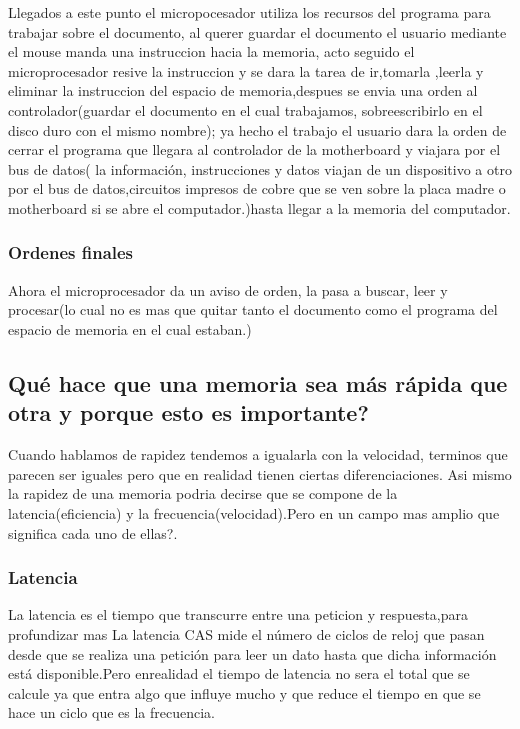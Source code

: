 \documentclass{article}
\begin{document}
        Llegados a este punto el micropocesador utiliza los recursos del programa para trabajar sobre el documento, al querer guardar el documento el usuario mediante el mouse manda una instruccion hacia la memoria, acto seguido el microprocesador resive la instruccion y se dara la tarea de ir,tomarla ,leerla y eliminar la instruccion del espacio de memoria,despues se envia  una orden al controlador(guardar el documento en el cual trabajamos, sobreescribirlo en el disco duro con el mismo nombre); ya hecho el trabajo el usuario dara la orden de cerrar el programa que llegara al controlador de la motherboard y viajara por el bus de datos( la información, instrucciones y datos viajan de un dispositivo a otro por el bus de datos,circuitos impresos de cobre que se ven sobre la placa madre o
        motherboard si se abre el computador.)hasta llegar  a la memoria del computador.\cite{profe}
        
        \subsubsection{Ordenes finales} Ahora el microprocesador da  un aviso de orden, la pasa a buscar, leer y procesar(lo cual no es mas que quitar tanto el documento como el programa del espacio de memoria en el cual estaban.)
        

    \subsection{Qué hace que una memoria sea más rápida que otra y porque esto es importante?}
    
    Cuando hablamos de rapidez tendemos a igualarla con la velocidad, terminos que parecen ser iguales pero que en realidad tienen ciertas diferenciaciones. Asi mismo la rapidez de  una memoria podria decirse que se compone de la latencia(eficiencia) y la frecuencia(velocidad).Pero en un campo mas amplio que significa cada uno de ellas?.
    
    \subsubsection{Latencia} La latencia es el tiempo que transcurre entre una peticion y respuesta,para profundizar mas La latencia CAS mide el número de ciclos de reloj que pasan desde que se realiza una petición para leer un dato hasta que dicha información está disponible.Pero enrealidad el tiempo de latencia no sera el total que se calcule ya que entra algo que influye mucho y que reduce el tiempo en que se hace un ciclo que es la frecuencia.\cite{profesional}
    
\end{document}
